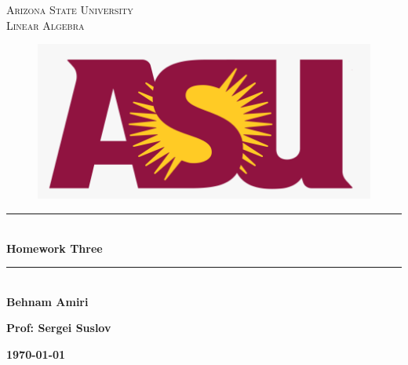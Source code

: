 \documentclass[fleqn]{article}
\begin{document}
  \begin{titlepage}

    \newcommand{\HRule}{\rule{\linewidth}{0.5mm}}

    \center


    \textsc{\LARGE Arizona State University}\\[1.5cm]

    \textsc{\LARGE Linear Algebra }\\[1.5cm]


    \begin{figure}
      \includegraphics[width=\linewidth]{asu.png}
    \end{figure}


    \HRule \\[0.4cm]
    { \huge \bfseries Homework Three}\\[0.4cm] 
    \HRule \\[1.5cm]

    \textbf{Behnam Amiri}

    \bigbreak

    \textbf{Prof: Sergei Suslov}

    \bigbreak


    \textbf{{\large \today}\\[2cm]}

    \vfill

  \end{titlepage}
\end{document}
